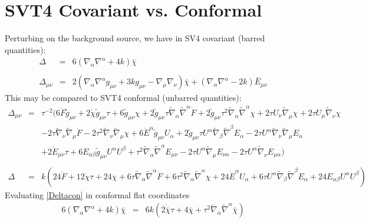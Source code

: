 \documentclass[10pt,letterpaper]{article}
\numberwithin{equation}{section}
\begin{document}
\section{SVT4 Covariant vs. Conformal}
Perturbing on the background source, we have in SV4 covariant (barred quantities):
\begin{eqnarray}
\Delta &=& 6(\nabla_\alpha\nabla^\alpha+4k)\bar \chi
\label{Deltacov}
\\ \nonumber\\
\Delta_{\mu\nu} &=& 2\left( \nabla_\alpha\nabla^\alpha g_{\mu\nu} +3k g_{\mu\nu} - \nabla_\mu\nabla_\nu\right)\bar \chi + (\nabla_\alpha\nabla^\alpha -2k) \bar E_{\mu\nu}
\label{Deltauvcov}
\end{eqnarray}
This may be compared to SVT4 conformal (unbarred quantities):
\begin{eqnarray}
\Delta_{\mu\nu} &=& \tau^{-2}\big( 6 \ddot{F} \tilde{g}_{\mu \nu}
+ 2 \dot{\chi} \tilde{g}_{\mu \nu} \tau
+ 6 \tilde{g}_{\mu \nu} \chi
+ 2 \tilde{g}_{\mu \nu} \tau \tilde{\nabla}_{\alpha}\tilde{\nabla}^{\alpha}\dot{F}
+ 2 \tilde{g}_{\mu \nu} \tau^2 \tilde{\nabla}_{\alpha}\tilde{\nabla}^{\alpha}\chi
+ 2 \tau U_{\nu} \tilde{\nabla}_{\mu}\chi
+ 2 \tau U_{\mu} \tilde{\nabla}_{\nu}\chi\nonumber\\
&& - 2 \tau \tilde{\nabla}_{\nu}\tilde{\nabla}_{\mu}\dot{F}
- 2 \tau^2 \tilde{\nabla}_{\nu}\tilde{\nabla}_{\mu}\chi
+6 \dot{E}^{\alpha} \tilde{g}_{\mu \nu} U_{\alpha}
+ 2 \tilde{g}_{\mu \nu} \tau U^{\alpha} \tilde{\nabla}_{\beta}\tilde{\nabla}^{\beta}E_{\alpha}
- 2 \tau U^{\alpha} \tilde{\nabla}_{\nu}\tilde{\nabla}_{\mu}E_{\alpha}
\nonumber\\
&&+2 \dot{E}_{\mu \nu} \tau
+ 6 E_{\alpha \beta} \tilde{g}_{\mu \nu} U^{\alpha} U^{\beta}
+ \tau^2 \tilde{\nabla}_{\alpha}\tilde{\nabla}^{\alpha}E_{\mu \nu}
- 2 \tau U^{\alpha} \tilde{\nabla}_{\mu}E_{\nu \alpha}
- 2 \tau U^{\alpha} \tilde{\nabla}_{\nu}E_{\mu \alpha} \big)
\label{Deltauvcon}
\\ \nonumber\\
\Delta &=&k( 24 \ddot{F} + 12 \dot{\chi} \tau + 24 \chi + 6 \tau \tilde{\nabla}_{\alpha}\tilde{\nabla}^{\alpha}\dot{F} + 6 \tau^2 \tilde{\nabla}_{\alpha}\tilde{\nabla}^{\alpha}\chi
+24 \dot{E}^{\alpha} U_{\alpha} + 6 \tau U^{\alpha} \tilde{\nabla}_{\beta}\tilde{\nabla}^{\beta}E_{\alpha}
+24 E_{\alpha \beta} U^{\alpha} U^{\beta} )
\label{Deltacon}
\end{eqnarray}
Evaluating \eqref{Deltacon} in conformal flat coordinates
\begin{eqnarray}
 6(\nabla_\alpha\nabla^\alpha+4k)\bar \chi &=& 6k ( 2  \dot{\bar \chi} \tau + 4 \bar \chi +  \tau^2 \tilde{\nabla}_{\alpha }\tilde{\nabla}^{\alpha }\bar \chi )
\end{eqnarray}
\end{document}
